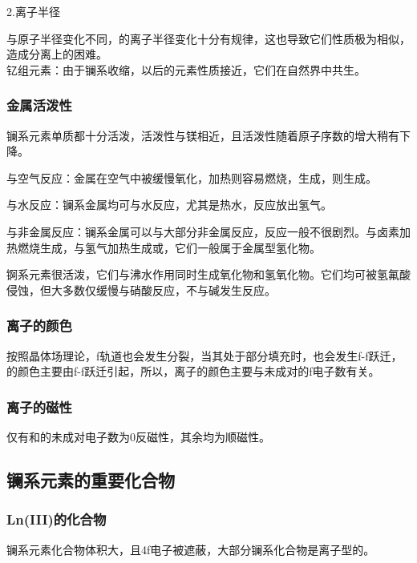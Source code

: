 \documentclass[a4paper,UTF8]{article}
\begin{document}
2.离子半径

与原子半径变化不同，的离子半径变化十分有规律，这也导致它们性质极为相似，造成分离上的困难。\\

钇组元素：由于镧系收缩，以后的元素性质接近，它们在自然界中共生。\\

\subsubsection{金属活泼性}

镧系元素单质都十分活泼，活泼性与镁相近，且活泼性随着原子序数的增大稍有下降。

与空气反应：金属在空气中被缓慢氧化，加热则容易燃烧，生成，则生成。

与水反应：镧系金属均可与水反应，尤其是热水，反应放出氢气。

与非金属反应：镧系金属可以与大部分非金属反应，反应一般不很剧烈。与卤素加热燃烧生成，与氢气加热生成或，它们一般属于金属型氢化物。

锕系元素很活泼，它们与沸水作用同时生成氧化物和氢氧化物。它们均可被氢氟酸侵蚀，但大多数仅缓慢与硝酸反应，不与碱发生反应。

\subsubsection{离子的颜色}

按照晶体场理论，f轨道也会发生分裂，当其处于部分填充时，也会发生f-f跃迁，的颜色主要由f-f跃迁引起，所以，离子的颜色主要与未成对的f电子数有关。

\subsubsection{离子的磁性}

仅有和的未成对电子数为0反磁性，其余均为顺磁性。

\subsection{镧系元素的重要化合物}

\subsubsection{Ln(III)的化合物}

镧系元素化合物体积大，且4f电子被遮蔽，大部分镧系化合物是离子型的。
\end{document}

